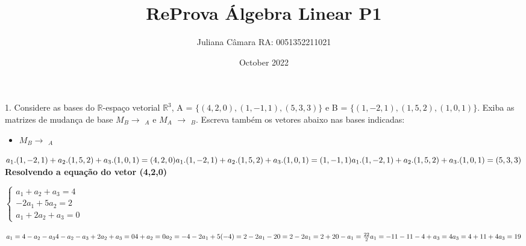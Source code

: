 \documentclass{article}
\title{ReProva Álgebra Linear P1}
\author{Juliana Câmara RA: 0051352211021}
\date{October 2022}
\begin{document}
\maketitle



\newpage


1. Considere as bases do $\mathbb{R}$-espaço vetorial $\mathbb{R}^3$, A = $\{(4,2,0),(1,-1,1),(5,3,3)\}$ e B = $\{(1,-2,1),(1,5,2),(1,0,1)\}$. Exiba as matrizes de mudança de base $M_{B}$$\to$ $_{A}$ e $M_{A}$ $\to$ $_{B}$. Escreva também os vetores abaixo nas bases indicadas:\\


\begin{itemize}
    \item $M_{B}$$\to$ $_{A}$
\end{itemize}


$\\
a_{1} . (1,-2,1) + a_{2}. (1,5,2) + a_{3}. (1,0,1) = (4,2,0)\newline
a_{1} . (1,-2,1) + a_{2}. (1,5,2) + a_{3}. (1,0,1) = (1,-1,1)\newline
a_{1} . (1,-2,1) + a_{2}. (1,5,2) + a_{3}. (1,0,1) = (5,3,3)\newline
$
\newline
\textbf{Resolvendo a equação do vetor (4,2,0)}
\vspace{0,5cm}

\begin{flushleft}
$
\left\{\begin{array}{ccc}
 a_{1} + a_{2} + a_{3} = 4\\
 -2a_{1} + 5a_{2} = 2\\
 a_{1} + 2a_{2} + a_{3} = 0
\end{array}\right.
$
\end{flushleft}

\vspace{0,5cm}

$\\
a_{1} = 4 - a_{2} - a_{3}\\
\newline
4 - a_{2} - a_{3} + 2a_{2} + a_{3} = 0\\
4 + a_{2} = 0\\
a_{2} = -4\\
\newline
-2a_{1} + 5(-4) = 2\\
-2a_{1} - 20 = 2\\
-2a_{1} = 2 + 20\\
-a_{1} = \frac{22}{2}\\
a_{1} = -11\\
\newline
-11 - 4 + a_{3} = 4\\
a_{3} = 4 + 11 + 4\\
a_{3} = 19\\
$
\end{document}
